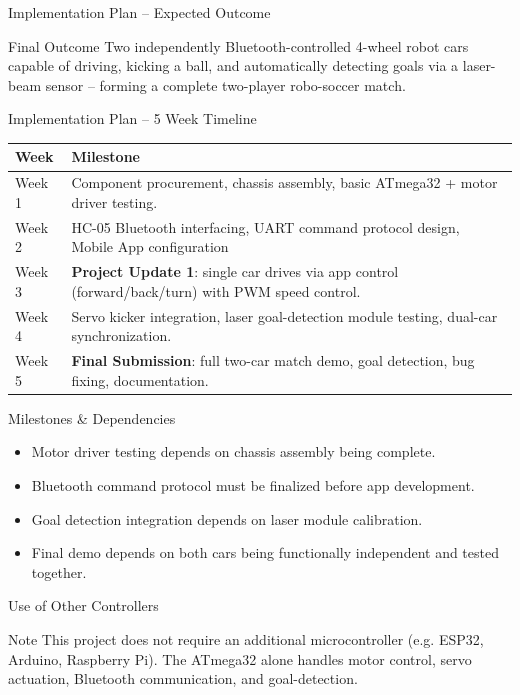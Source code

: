 \documentclass[aspectratio=169]{beamer}
\begin{document}
\begin{frame}{Implementation Plan -- Expected Outcome}
  \begin{block}{Final Outcome}
    Two independently Bluetooth-controlled 4-wheel robot cars capable of
    driving, kicking a ball, and automatically detecting goals via a
    laser-beam sensor -- forming a complete two-player robo-soccer match.
  \end{block}
\end{frame}

\begin{frame}{Implementation Plan -- 5 Week Timeline}
  \small
  \begin{tabular}{@{}p{1.6cm}p{9.7cm}}
    \toprule
    \textbf{Week} & \textbf{Milestone} \\
    \midrule
    Week 1 & Component procurement, chassis assembly, basic ATmega32 + motor driver testing. \\
    Week 2 & HC-05 Bluetooth interfacing, UART command protocol design, Mobile App configuration \\
    \rowcolor{amber!25} Week 3 & \textbf{Project Update 1}: single car drives via app control (forward/back/turn) with PWM speed control. \\
    Week 4 & Servo kicker integration, laser goal-detection module testing, dual-car synchronization. \\
    \rowcolor{amber!25} Week 5 & \textbf{Final Submission}: full two-car match demo, goal detection, bug fixing, documentation. \\
    \bottomrule
  \end{tabular}
\end{frame}

\begin{frame}{Milestones \& Dependencies}
  \begin{itemize}
    \item Motor driver testing depends on chassis assembly being complete.
    \item Bluetooth command protocol must be finalized before app development.
    \item Goal detection integration depends on laser module calibration.
    \item Final demo depends on both cars being functionally independent and tested together.
  \end{itemize}
\end{frame}

\begin{frame}{Use of Other Controllers}
  \begin{block}{Note}
    This project does not require an additional microcontroller (e.g. ESP32,
    Arduino, Raspberry Pi). The ATmega32 alone handles motor control, servo
    actuation, Bluetooth communication, and goal-detection.
  \end{block}

\end{frame}
\end{document}
